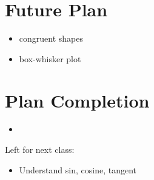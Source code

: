 \documentclass[12pt]{article}
\begin{document}
\section{Future Plan}
\begin{itemize}
    \item congruent shapes
    \item box-whisker plot

\end{itemize}
\section{Plan Completion}
\begin{itemize}
    \item 
\end{itemize}
Left for next class: 
\begin{itemize}
    \item Understand sin, cosine, tangent
\end{itemize}
\end{document}
